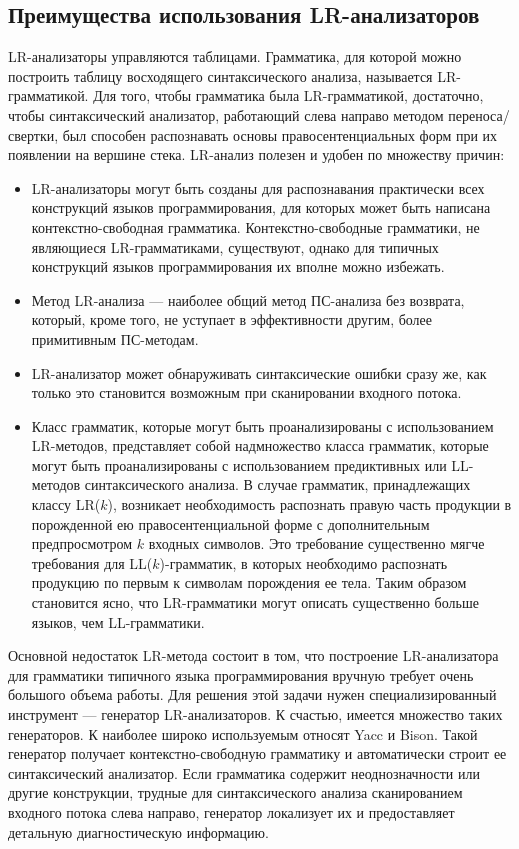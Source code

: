 \documentclass[bachelor, och, coursework, times]{SCWorks}
\begin{document}
\subsection{Преимущества использования LR-анализаторов}
LR-анализаторы управляются таблицами. Грамматика, для которой можно построить таблицу восходящего синтаксического анализа, называется LR-грамматикой. Для того, чтобы грамматика была LR-грамматикой, достаточно, чтобы синтаксический анализатор,  работающий слева направо методом переноса/свертки, был способен распознавать основы правосентенциальных форм при их появлении на вершине стека. 
LR-анализ полезен и удобен по множеству причин:
\begin{itemize}
	\item LR-анализаторы могут быть созданы для распознавания практически всех конструкций языков программирования, для которых может быть написана контекстно-свободная грамматика. Контекстно-свободные грамматики, не являющиеся LR-грамматиками, существуют, однако для типичных конструкций языков программирования их вполне можно избежать.
	\item Метод LR-анализа --- наиболее общий метод ПС-анализа без возврата, который, кроме того, не уступает в эффективности другим, более примитивным ПС-методам.
	\item LR-анализатор может обнаруживать синтаксические ошибки сразу же, как только это становится возможным при сканировании входного потока. 
	\item Класс грамматик, которые могут быть проанализированы с использованием LR-методов, представляет собой надмножество класса грамматик, которые могут быть проанализированы с использованием предиктивных или LL-методов синтаксического анализа. В случае грамматик, принадлежащих классу LR($k$), возникает необходимость распознать правую часть продукции в порожденной ею правосентенциальной форме с дополнительным предпросмотром $k$ входных символов. Это требование существенно мягче требования для LL($k$)-грамматик, в которых необходимо распознать продукцию по первым к символам порождения ее тела. Таким образом становится ясно, что LR-грамматики могут описать существенно больше языков, чем LL-грамматики. 
\end{itemize}

Основной недостаток LR-метода состоит в том, что построение LR-анализатора для грамматики типичного языка программирования вручную требует очень большого объема работы. Для решения этой задачи нужен специализированный инструмент --- генератор LR-анализаторов. К счастью, имеется множество таких генераторов. К наиболее широко используемым относят Yacc и Bison. Такой генератор получает контекстно-свободную грамматику и автоматически строит ее синтаксический анализатор. Если грамматика содержит неоднозначности или другие конструкции, трудные для синтаксического анализа сканированием входного потока слева направо, генератор локализует их и предоставляет детальную диагностическую информацию.~\cite{Sereb}
\end{document}
